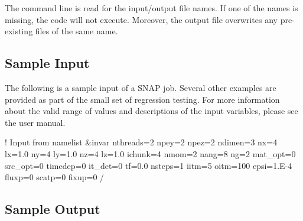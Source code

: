 The command line is read for the input/output file names. If one of the names is missing, the code will not execute. Moreover, the output file overwrites any pre-\/existing files of the same name.

\subsection*{Sample Input}

The following is a sample input of a S\-N\-A\-P job. Several other examples are provided as part of the small set of regression testing. For more information about the valid range of values and descriptions of the input variables, please see the user manual. \begin{DoxyVerb}! Input from namelist
&invar
  nthreads=2
  npey=2
  npez=2
  ndimen=3
  nx=4
  lx=1.0
  ny=4
  ly=1.0
  nz=4
  lz=1.0
  ichunk=4
  nmom=2
  nang=8
  ng=2
  mat_opt=0
  src_opt=0
  timedep=0
  it_det=0
  tf=0.0
  nsteps=1
  iitm=5
  oitm=100
  epsi=1.E-4
  fluxp=0
  scatp=0
  fixup=0
/
\end{DoxyVerb}


\subsection*{Sample Output}

